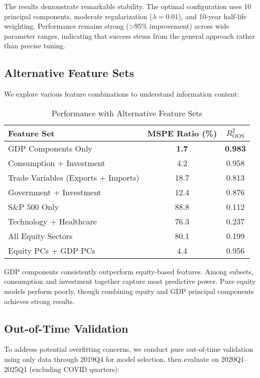 \documentclass[11pt,letterpaper]{article}
\theoremstyle{plain}
\theoremstyle{definition}
\theoremstyle{remark}
\begin{document}
The results demonstrate remarkable stability. The optimal configuration uses 10 principal components, moderate regularization ($\lambda = 0.01$), and 10-year half-life weighting. Performance remains strong (>95\% improvement) across wide parameter ranges, indicating that success stems from the general approach rather than precise tuning.

\subsection{Alternative Feature Sets}

We explore various feature combinations to understand information content:

\begin{table}[htbp]
\centering
\caption{Performance with Alternative Feature Sets}
\label{tab:features}
\begin{tabular}{lcc}
\toprule
Feature Set & MSPE Ratio (\%) & $R^2_{\text{OOS}}$ \\
\midrule
GDP Components Only & \textbf{1.7} & \textbf{0.983} \\
Consumption + Investment & 4.2 & 0.958 \\
Trade Variables (Exports + Imports) & 18.7 & 0.813 \\
Government + Investment & 12.4 & 0.876 \\
\midrule
S\&P 500 Only & 88.8 & 0.112 \\
Technology + Healthcare & 76.3 & 0.237 \\
All Equity Sectors & 80.1 & 0.199 \\
Equity PCs + GDP PCs & 4.4 & 0.956 \\
\bottomrule
\end{tabular}
\end{table}

GDP components consistently outperform equity-based features. Among subsets, consumption and investment together capture most predictive power. Pure equity models perform poorly, though combining equity and GDP principal components achieves strong results.

\subsection{Out-of-Time Validation}

To address potential overfitting concerns, we conduct pure out-of-time validation using only data through 2019Q4 for model selection, then evaluate on 2020Q1--2025Q1 (excluding COVID quarters):
\end{document}
